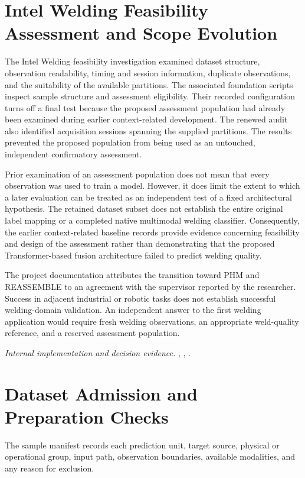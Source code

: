 \section{Intel Welding Feasibility Assessment and Scope Evolution}

The Intel Welding feasibility investigation examined dataset structure, observation readability, timing and session information, duplicate observations, and the suitability of the available partitions. The associated foundation scripts inspect sample structure and assessment eligibility. Their recorded configuration turns off a final test because the proposed assessment population had already been examined during earlier context-related development. The renewed audit also identified acquisition sessions spanning the supplied partitions. The results prevented the proposed population from being used as an untouched, independent confirmatory assessment.

Prior examination of an assessment population does not mean that every observation was used to train a model. However, it does limit the extent to which a later evaluation can be treated as an independent test of a fixed architectural hypothesis. The retained dataset subset does not establish the entire original label mapping or a completed native multimodal welding classifier. Consequently, the earlier context-related baseline records provide evidence concerning feasibility and design of the assessment rather than demonstrating that the proposed Transformer-based fusion architecture failed to predict welding quality.

The project documentation attributes the transition toward PHM and REASSEMBLE to an agreement with the supervisor reported by the researcher. Success in adjacent industrial or robotic tasks does not establish successful welding-domain validation. An independent answer to the first welding application would require fresh welding observations, an appropriate weld-quality reference, and a reserved assessment population.

\noindent\textit{Internal implementation and decision evidence.} , , .

\section{Dataset Admission and Preparation Checks}
\label{sec:ch4-admission}

The sample manifest records each prediction unit, target source, physical or operational group, input path, observation boundaries, available modalities, and any reason for exclusion.

